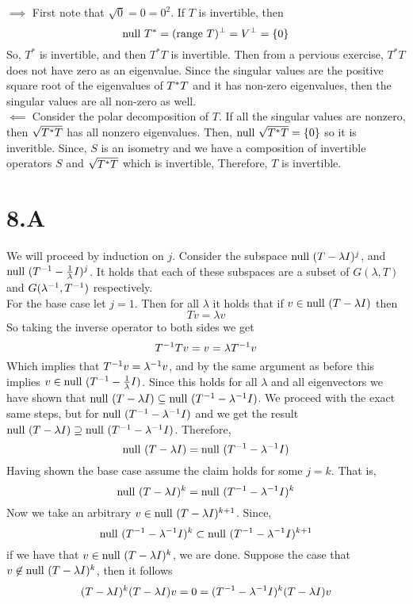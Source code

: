 \documentclass[10pt, twocolumn]{article}
\begin{document}
\begin{q}[13]
    $ \implies $
    First note that $ \sqrt{0} = 0 = 0^2 $.
    If $ T $ is invertible, then $$ \text{null } T^* = (\text{range } T)^\perp = V^\perp = \{0\} $$
    So, $ T^* $ is invertible, and then $ T^*T $ is invertible.  
    Then from a pervious exercise, $ T^* T $ does not have zero as an eigenvalue.
    Since the singular values are the positive square root of the eigenvalues of $ T^* T $ and it has non-zero eigenvalues, 
    then the singular values are all non-zero as well. \\
    $ \impliedby $ Consider the polar decomposition of $ T $. 
    If all the singular values are nonzero, then $ \sqrt{T^* T} $ has all nonzero eigenvalues.
    Then, $ \text{null } \sqrt{T^* T} = \{0\} $ so it is inveritble. 
    Since, $ S $ is an isometry and we have a composition of invertible operators $ S $ and $ \sqrt{T^* T} $ which is invertible, 
    Therefore, $ T $ is invertible.
\end{q}

\pagebreak
\section{8.A}

\begin{q}[3]
    We will proceed by induction on $ j $. 
    Consider the subspace $ \text{null } (T - \lambda I)^j $, 
    and $ \text{null } (T^{-1} - \frac{1}{\lambda} I)^j $. 
    It holds that each of these subspaces are a subset of 
    $ G(\lambda, T) $ and $ G(\lambda^{-1}, T^{-1}) $ respectively. \\
    For the base case let $ j = 1 $.
    Then for all $ \lambda $ it holds that if 
    $ v \in \text{null } (T - \lambda I) $ then 
    $$ Tv = \lambda v $$
    So taking the inverse operator to both sides we get
    $$ T^{-1}Tv = v = \lambda T^{-1} v $$
    Which implies that 
    $ T^{-1}v = \lambda^{-1} v $, 
    and by the same argument as before this implies $ v \in \text{null } (T^{-1} - \frac{1}{\lambda} I) $. 
    Since this holds for all $ \lambda $ 
    and all eigenvectors we have shown that 
    $ \text{null } (T - \lambda I) \subseteq \text{null } (T^{-1} - \lambda^{-1} I) $. 
    We proceed with the exact same steps, but for $\text{null } (T^{-1} - \lambda^{-1} I) $ and we get the result
    $ \text{null } (T - \lambda I) \supseteq \text{null } (T^{-1} - \lambda^{-1} I) $. 
    Therefore, 
    $$ \text{null } (T - \lambda I) = \text{null } (T^{-1} - \lambda^{-1} I) $$
    Having shown the base case assume the claim holds for some $ j = k $.
    That is, 
    $$ \text{null } (T - \lambda I)^k = \text{null } (T^{-1} - \lambda^{-1} I)^k $$
    Now we take an arbitrary $ v \in \text{null } (T - \lambda I)^{k+1} $. 
    Since, 
    $$ \text{null } (T^{-1} - \lambda^{-1} I)^k \subset \text{null } (T^{-1} - \lambda^{-1} I)^{k + 1} $$
    if we have that $ v \in \text{null } (T - \lambda I)^{k} $, we are done. 
    Suppose the case that $ v \not\in \text{null } (T - \lambda I)^{k} $, 
    then it follows 
    $$ (T - \lambda I)^k (T - \lambda I) v = 0 = (T^{-1} - \lambda^{-1} I)^k (T - \lambda I)v $$

\end{q}
\end{document}
